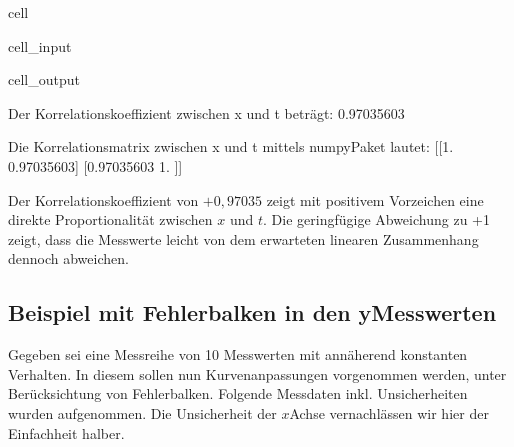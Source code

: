 \documentclass[letterpaper,10pt,english]{jupyterBook}
\begin{document}
\begin{sphinxuseclass}{cell}
\begin{sphinxVerbatimInput}
\begin{sphinxuseclass}{cell_input}
\end{sphinxuseclass}\end{sphinxVerbatimInput}
\begin{sphinxVerbatimOutput}

\begin{sphinxuseclass}{cell_output}
\begin{sphinxVerbatim}[commandchars=\\\{\}]
Der Korrelationskoeffizient zwischen x und t beträgt: 0.97035603

Die Korrelationsmatrix zwischen x und t mittels numpy\PYGZhy{}Paket lautet:
[[1.         0.97035603]
 [0.97035603 1.        ]]
\end{sphinxVerbatim}

\end{sphinxuseclass}\end{sphinxVerbatimOutput}

\end{sphinxuseclass}
\sphinxAtStartPar
Der Korrelationskoeffizient von \(+ 0,97035\) zeigt mit positivem Vorzeichen eine direkte Proportionalität zwischen \(x\) und \(t\). Die geringfügige Abweichung zu +1 zeigt, dass die Messwerte leicht von dem erwarteten linearen Zusammenhang dennoch abweichen.


\subsection{Beispiel mit Fehlerbalken in den y\sphinxhyphen{}Messwerten }
\label{\detokenize{content/1_Kurvenanpassung:beispiel-mit-fehlerbalken-in-den-y-messwerten-a-id-sec-beispiel-fehlerbalken-a}}
\sphinxAtStartPar
Gegeben sei eine Messreihe von 10 Messwerten mit annäherend konstanten Verhalten. In diesem sollen nun Kurvenanpassungen vorgenommen werden, unter Berücksichtung von Fehlerbalken. Folgende Messdaten inkl. Unsicherheiten wurden aufgenommen. Die Unsicherheit der \(x\)\sphinxhyphen{}Achse vernachlässen wir hier der Einfachheit halber.
\end{document}
